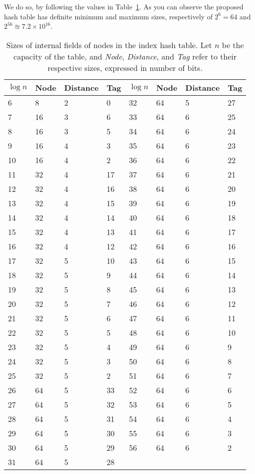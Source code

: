 We do so, by following the values in Table~\ref{tab:robin-hood-nodes}.
As you can observe the proposed hash table has definite minimum and maximum sizes, respectively of $2^{6} = 64$ and $2^{56} \approxeq 7.2 \times 10^{16}$.

\begin{table}
	\centering\begin{tabular}{llll|llll}
		$\log n$ & Node & Distance & Tag & $\log n$ & Node & Distance & Tag\\
		\hline
		6 & 8 & 2 & 0 & 32 & 64 & 5 & 27 \\
		7 & 16 & 3 & 6 & 33 & 64 & 6 & 25 \\
		8 & 16 & 3 & 5 & 34 & 64 & 6 & 24 \\
		9 & 16 & 4 & 3 & 35 & 64 & 6 & 23 \\
		10 & 16 & 4 & 2 & 36 & 64 & 6 & 22 \\
		11 & 32 & 4 & 17 & 37 & 64 & 6 & 21 \\
		12 & 32 & 4 & 16 & 38 & 64 & 6 & 20 \\
		13 & 32 & 4 & 15 & 39 & 64 & 6 & 19 \\
		14 & 32 & 4 & 14 & 40 & 64 & 6 & 18 \\
		15 & 32 & 4 & 13 & 41 & 64 & 6 & 17 \\
		16 & 32 & 4 & 12 & 42 & 64 & 6 & 16 \\
		17 & 32 & 5 & 10 & 43 & 64 & 6 & 15 \\
		18 & 32 & 5 & 9 & 44 & 64 & 6 & 14 \\
		19 & 32 & 5 & 8 & 45 & 64 & 6 & 13 \\
		20 & 32 & 5 & 7 & 46 & 64 & 6 & 12 \\
		21 & 32 & 5 & 6 & 47 & 64 & 6 & 11 \\
		22 & 32 & 5 & 5 & 48 & 64 & 6 & 10 \\
		23 & 32 & 5 & 4 & 49 & 64 & 6 & 9 \\
		24 & 32 & 5 & 3 & 50 & 64 & 6 & 8 \\
		25 & 32 & 5 & 2 & 51 & 64 & 6 & 7 \\
		26 & 64 & 5 & 33 & 52 & 64 & 6 & 6 \\
		27 & 64 & 5 & 32 & 53 & 64 & 6 & 5 \\
		28 & 64 & 5 & 31 & 54 & 64 & 6 & 4 \\
		29 & 64 & 5 & 30 & 55 & 64 & 6 & 3 \\
		30 & 64 & 5 & 29 & 56 & 64 & 6 & 2 \\
		31 & 64 & 5 & 28 & \\
	\end{tabular}
	\caption{Sizes of internal fields of nodes in the index hash table. Let $n$ be the capacity of the table, and \emph{Node}, \emph{Distance}, and \emph{Tag} refer to their respective sizes, expressed in number of bits.}
	\label{tab:robin-hood-nodes}
\end{table}

